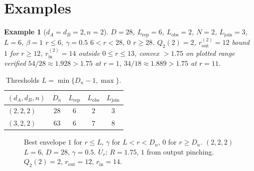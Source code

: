 \documentclass[11pt,a4paper]{article}
\newtheorem{example}[theorem]{Example}
\begin{document}
\section{Examples}
\begin{example}[$d_A=d_B=2,n=2$]
$D=28$, $L_{\mathrm{rep}}=6$, $L_{\mathrm{obs}}=2$, $N=2$, $L_{\mathrm{join}}=3$, $L=6$, $\beta=1$ $r\le6$, $\gamma=0.5$ $6<r<28$, $0$ $r\ge28$. $Q_2(2)=2$, $r_{\mathrm{out}}^{(2)}=12$ bound $1$ for $r\ge12$, $r_{\mathrm{in}}^{(2)}=14$ outside $0\le r\le13$, convex $>1.75$ on plotted range verified $54/28\approx1.928>1.75$ at $r=1$, $34/18\approx1.889>1.75$ at $r=11$.
\end{example}
\begin{table}[h]\centering\begin{tabular}{lcccc}\toprule $(d_A,d_B,n)$ & $D_n$ & $L_{\mathrm{rep}}$ & $L_{\mathrm{obs}}$ & $L_{\mathrm{join}}$ \\\midrule $(2,2,2)$ & $28$ & $6$ & $2$ & $3$ \\ $(3,2,2)$ & $63$ & $6$ & $7$ & $8$ \\\bottomrule\end{tabular}\caption{Thresholds $L=\min\{D_n-1,\max\}$.}\end{table}
\begin{figure}[h]\centering{}\caption{Best envelope $1$ for $r\le L$, $\gamma$ for $L<r<D_n$, $0$ for $r\ge D_n$. $(2,2,2)$ $L=6$, $D=28$, $\gamma=0.5$. $U_r$: $R=1.75$, $1$ from output pinching. $Q_2(2)=2$, $r_{\mathrm{out}}=12$, $r_{\mathrm{in}}=14$.}\end{figure}
\appendix
\end{document}
